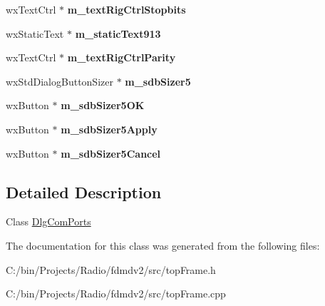 \begin{DoxyCompactItemize}
\item 
\hypertarget{class_dlg_com_ports_a1bf803269da16b3f56c2c5bd21ba484b}{wx\-Text\-Ctrl $\ast$ {\bfseries m\-\_\-text\-Rig\-Ctrl\-Stopbits}}\label{class_dlg_com_ports_a1bf803269da16b3f56c2c5bd21ba484b}

\item 
\hypertarget{class_dlg_com_ports_a4feeee0f9422f971e0ae0abd6a6ef68c}{wx\-Static\-Text $\ast$ {\bfseries m\-\_\-static\-Text913}}\label{class_dlg_com_ports_a4feeee0f9422f971e0ae0abd6a6ef68c}

\item 
\hypertarget{class_dlg_com_ports_a807f268b9b09eece038789b3b57eda1c}{wx\-Text\-Ctrl $\ast$ {\bfseries m\-\_\-text\-Rig\-Ctrl\-Parity}}\label{class_dlg_com_ports_a807f268b9b09eece038789b3b57eda1c}

\item 
\hypertarget{class_dlg_com_ports_ace2a43e0c378c7c1e032d10ba7f082d5}{wx\-Std\-Dialog\-Button\-Sizer $\ast$ {\bfseries m\-\_\-sdb\-Sizer5}}\label{class_dlg_com_ports_ace2a43e0c378c7c1e032d10ba7f082d5}

\item 
\hypertarget{class_dlg_com_ports_a2ff33e71acd9d244306526c9e1c914f8}{wx\-Button $\ast$ {\bfseries m\-\_\-sdb\-Sizer5\-O\-K}}\label{class_dlg_com_ports_a2ff33e71acd9d244306526c9e1c914f8}

\item 
\hypertarget{class_dlg_com_ports_a370f3c0a292163cfc65c09f85be962f7}{wx\-Button $\ast$ {\bfseries m\-\_\-sdb\-Sizer5\-Apply}}\label{class_dlg_com_ports_a370f3c0a292163cfc65c09f85be962f7}

\item 
\hypertarget{class_dlg_com_ports_abad0ef2595c613184b545ecd91b994d9}{wx\-Button $\ast$ {\bfseries m\-\_\-sdb\-Sizer5\-Cancel}}\label{class_dlg_com_ports_abad0ef2595c613184b545ecd91b994d9}

\end{DoxyCompactItemize}


\subsection{Detailed Description}
Class \hyperlink{class_dlg_com_ports}{Dlg\-Com\-Ports} 

The documentation for this class was generated from the following files\-:\begin{DoxyCompactItemize}
\item 
C\-:/bin/\-Projects/\-Radio/fdmdv2/src/top\-Frame.\-h\item 
C\-:/bin/\-Projects/\-Radio/fdmdv2/src/top\-Frame.\-cpp\end{DoxyCompactItemize}
